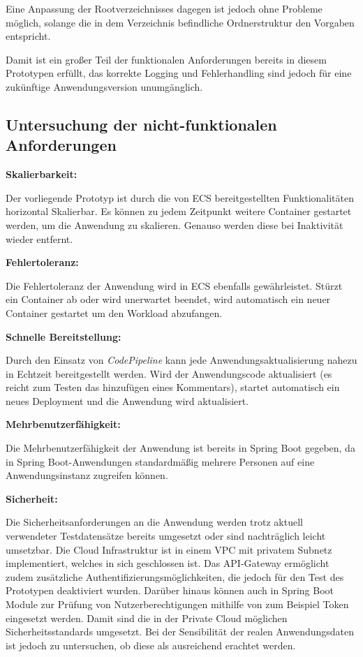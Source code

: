 Eine Anpassung der Rootverzeichnisses dagegen ist jedoch ohne Probleme möglich, solange die in dem Verzeichnis befindliche Ordnerstruktur den Vorgaben entspricht.

Damit ist ein großer Teil der funktionalen Anforderungen bereits in diesem Prototypen erfüllt, das korrekte Logging und Fehlerhandling sind jedoch für eine zukünftige Anwendungsversion unumgänglich.

\subsection{Untersuchung der nicht-funktionalen Anforderungen}
\textbf{Skalierbarkeit:}

Der vorliegende Prototyp ist durch die von \ac{ECS} bereitgestellten Funktionalitäten horizontal Skalierbar. Es können zu jedem Zeitpunkt weitere Container gestartet werden, um die Anwendung zu skalieren. Genauso werden diese bei Inaktivität wieder entfernt.

\textbf{Fehlertoleranz:}

Die Fehlertoleranz der Anwendung wird in \ac{ECS} ebenfalls gewährleistet. Stürzt ein Container ab oder wird unerwartet beendet, wird automatisch ein neuer Container gestartet um den Workload abzufangen.

\textbf{Schnelle Bereitstellung:}

Durch den Einsatz von \textit{CodePipeline} kann jede Anwendungsaktualisierung nahezu in Echtzeit bereitgestellt werden. Wird der Anwendungscode aktualisiert (es reicht zum Testen das hinzufügen eines Kommentars), startet automatisch ein neues Deployment und die Anwendung wird aktualisiert.

\textbf{Mehrbenutzerfähigkeit:}

Die Mehrbenutzerfähigkeit der Anwendung ist bereits in \gls{Spring Boot} gegeben, da in \gls{Spring Boot}-Anwendungen standardmäßig mehrere Personen auf eine Anwendungsinstanz zugreifen können. \pagebreak

\textbf{Sicherheit:}

Die Sicherheitsanforderungen an die Anwendung werden trotz aktuell verwendeter Testdatensätze bereits umgesetzt oder sind nachträglich leicht umsetzbar. Die Cloud Infrastruktur ist in einem \ac{VPC} mit privatem Subnetz implementiert, welches in sich geschlossen ist. Das API-Gateway ermöglicht zudem zusätzliche Authentifizierungsmöglichkeiten, die jedoch für den Test des Prototypen deaktiviert wurden. Darüber hinaus können auch in \gls{Spring Boot} Module zur Prüfung von Nutzerberechtigungen mithilfe von zum Beispiel Token eingesetzt werden. Damit sind die in der Private Cloud möglichen Sicherheitsstandards umgesetzt. Bei der Sensibilität der realen Anwendungsdaten ist jedoch zu untersuchen, ob diese als ausreichend erachtet werden.

